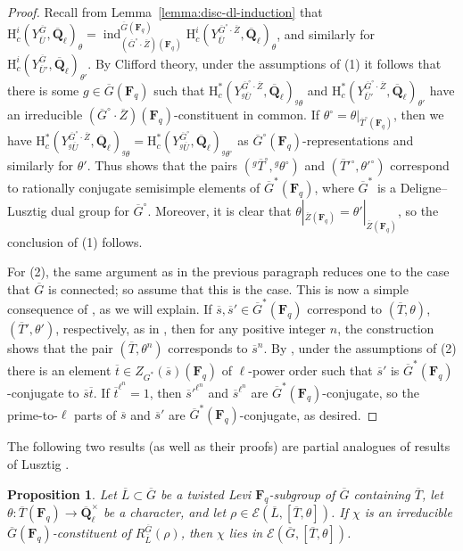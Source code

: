 \documentclass[reqno]{amsart}
\numberwithin{equation}{subsection}
\newcommand{\F}{\mathbf{F}}
\newcommand{\Q}{\mathbf{Q}}
\newcommand{\ol}[1]{\overline{#1}}
\newcommand{\co}{\colon}
\newcommand\cE{\mathcal{E}}
\DeclareMathOperator{\ind}{ind}
\newcommand{\rH}{\ensuremath{\mathrm{H}}\xspace}
\newtheorem{prop}[thm]{Proposition}
\theoremstyle{remark}
\numberwithin{equation}{subsection}
\numberwithin{figure}{subsection}
\begin{document}
\begin{proof}
    Recall from Lemma~\ref{lemma:disc-dl-induction} that $\rH_c^i(Y_{\ol U}^{\ol G}, \ol\Q_\ell)_\theta = \ind_{(\ol G^\circ \cdot \ol Z)(\F_q)}^{\ol G(\F_q)} \rH_c^i(Y_{\ol U}^{\ol G^\circ \cdot \ol Z}, \ol\Q_\ell)_\theta$, and similarly for $\rH_c^i(Y_{\ol U'}^{\ol G}, \ol\Q_\ell)_{\theta'}$. By Clifford theory, under the assumptions of (1) it follows that there is some $g \in \ol G(\F_q)$ such that $\rH_c^*(Y_{^g\ol U}^{\ol G^\circ \cdot \ol Z}, \ol\Q_\ell)_{^g\theta}$ and $\rH_c^*(Y_{\ol U'}^{\ol G^\circ \cdot \ol Z}, \ol\Q_\ell)_{\theta'}$ have an irreducible $(\ol G^\circ \cdot \ol Z)(\F_q)$-constituent in common. If $\theta^\circ = \theta|_{\ol T^\circ(\F_q)}$, then we have $\rH_c^*(Y_{^g\ol U}^{\ol G^\circ \cdot \ol Z}, \ol\Q_\ell)_{^g\theta} = \rH_c^*(Y_{^g\ol U}^{\ol G^\circ}, \ol\Q_\ell)_{^g\theta^\circ}$ as $\ol G^\circ(\F_q)$-representations and similarly for $\theta'$. Thus \cite[Th\'eor\`eme 11.8(a)]{Bon06} shows that the pairs $(^g \ol T^\circ, {}^g\theta^\circ)$ and $(\ol T'^\circ, \theta'^\circ)$ correspond to rationally conjugate semisimple elements of $\ol G^*(\F_q)$, where $\ol G^*$ is a Deligne--Lusztig dual group for $\ol G^\circ$. Moreover, it is clear that $\theta|_{\ol Z(\F_q)} = \theta'|_{\ol Z(\F_q)}$, so the conclusion of (1) follows.

    For (2), the same argument as in the previous paragraph reduces one to the case that $\ol G$ is connected; so assume that this is the case. This is now a simple consequence of \cite[Th\'eor\`eme 2.2]{BM89}, as we will explain. If $\ol s, \ol s' \in \ol G^*(\F_q)$ correspond to $(\ol T, \theta)$, $(\ol T', \theta')$, respectively, as in \cite[(5.21.6)]{DL76}, then for any positive integer $n$, the construction shows that the pair $(\ol T,\theta^n)$ corresponds to $\ol s^n$. By \cite[Th\'eor\`eme 2.2]{BM89}, under the assumptions of (2) there is an element $\ol t \in Z_{G^*}(\ol s)(\F_q)$ of $\ell$-power order such that $\ol s'$ is $\ol G^*(\F_q)$-conjugate to $\ol s \ol t$. If $\ol t^{\ell^n} = 1$, then $\ol s'^{\ell^n}$ and $\ol s^{\ell^n}$ are $\ol G^*(\F_q)$-conjugate, so the prime-to-$\ell$ parts of $\ol s$ and $\ol s'$ are $\ol G^*(\F_q)$-conjugate, as desired.
\end{proof}

The following two results (as well as their proofs) are partial analogues of results of Lusztig \cite[Th\'eor\`eme 11.10, Corollaire~11.11]{Bon06}.

\begin{prop}\label{prop:bonnafe-11.10}
    Let $\ol L \subset \ol G$ be a twisted Levi $\F_q$-subgroup of $\ol G$ containing $\ol T$, let $\theta\co \ol T(\F_q) \to \ol\Q_\ell^\times$ be a character, and let $\rho \in \cE(\ol L, [\ol T, \theta])$. If $\chi$ is an irreducible $\ol G(\F_q)$-constituent of $R^{\ol G}_{\ol L}(\rho)$, then $\chi$ lies in $\cE(\ol G, [\ol T,\theta])$.
\end{prop}
\end{document}
